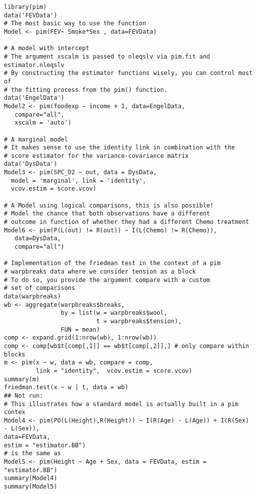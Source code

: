 \begin{lstlisting}
library(pim)
data('FEVData')
# The most basic way to use the function
Model <- pim(FEV~ Smoke*Sex , data=FEVData)

# A model with intercept
# The argument xscalm is passed to nleqslv via pim.fit and estimator.nleqslv
# By constructing the estimator functions wisely, you can control most of
# the fitting process from the pim() function.
data('EngelData')
Model2 <- pim(foodexp ~ income + 1, data=EngelData,
   compare="all",
   xscalm = 'auto')

# A marginal model
# It makes sense to use the identity link in combination with the 
# score estimator for the variance-covariance matrix
data('DysData')
Model3 <- pim(SPC_D2 ~ out, data = DysData,
  model = 'marginal', link = 'identity',
  vcov.estim = score.vcov)

# A Model using logical comparisons, this is also possible!
# Model the chance that both observations have a different
# outcome in function of whether they had a different Chemo treatment
Model6 <- pim(P(L(out) != R(out)) ~ I(L(Chemo) != R(Chemo)),
   data=DysData,
   compare="all")

# Implementation of the friedman test in the context of a pim
# warpbreaks data where we consider tension as a block
# To do so, you provide the argument compare with a custom 
# set of comparisons
data(warpbreaks)
wb <- aggregate(warpbreaks$breaks,
                by = list(w = warpbreaks$wool,
                          t = warpbreaks$tension),
                FUN = mean)
comp <- expand.grid(1:nrow(wb), 1:nrow(wb))
comp <- comp[wb$t[comp[,1]] == wb$t[comp[,2]],] # only compare within blocks
m <- pim(x ~ w, data = wb, compare = comp, 
         link = "identity",  vcov.estim = score.vcov)
summary(m)
friedman.test(x ~ w | t, data = wb)
## Not run: 
# This illustrates how a standard model is actually built in a pim contex
Model4 <- pim(PO(L(Height),R(Height)) ~ I(R(Age) - L(Age)) + I(R(Sex) - L(Sex)),
data=FEVData, 
estim = "estimator.BB")
# is the same as
Model5 <- pim(Height ~ Age + Sex, data = FEVData, estim = "estimator.BB")
summary(Model4)
summary(Model5)
\end{lstlisting}